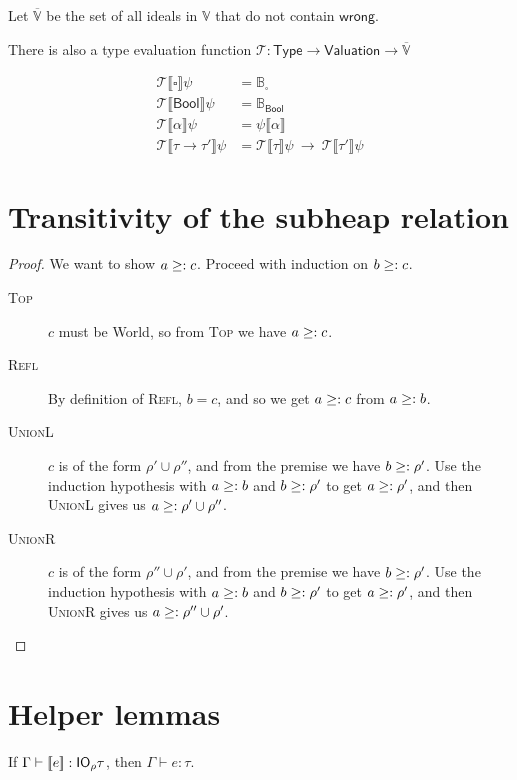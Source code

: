 Let $\overline{\mathbb{V}}$ be the set of all ideals in $\mathbb{V}$
that do not contain $\mathsf{wrong}$.

There is also a type evaluation function $\mathcal{T} : \mathsf{Type}
\rightarrow \mathsf{Valuation} \rightarrow \overline{\mathbb{V}}$

\begin{align*}
  \mathcal{T}\llbracket \square \rrbracket\psi &= \mathbb{B}_{ \square } \\
  \mathcal{T}\llbracket \mathsf{Bool} \rrbracket \psi &= \mathbb{B}_{\mathsf{Bool}} \\
  \mathcal{T}\llbracket \alpha \rrbracket \psi &= \psi \llbracket \alpha \rrbracket \\
  \mathcal{T} \llbracket \tau \rightarrow \tau' \rrbracket \psi &= \mathcal{T}\llbracket \tau \rrbracket \psi \ \rightarrow \
                             \mathcal{T} \llbracket \tau' \rrbracket \psi
\end{align*}


\section{Transitivity of the subheap relation}\label{proof:subheaptransitive}
\begin{proof}
  We want to show $a \geq: c$. Proceed with induction on $b \geq: c$.
  \begin{description}
  \item[\rm\textsc{Top}]
    $c$ must be \textsf{World}, so from \textsc{Top} we have $a
    \geq: c$.
  \item[\rm\textsc{Refl}] By definition of \textsc{Refl}, $b =
    c$, and so we get $a \geq: c$ from $a \geq: b$.
  \item[\rm\textsc{UnionL}] $c$ is of the form $\rho' \cup \rho''$, and
    from the premise we have $b \geq: \rho'$. Use the induction
    hypothesis with $a \geq: b$ and $b \geq: \rho'$ to get $a \geq:
    \rho'$, and then \textsc{UnionL} gives us $a \geq: \rho' \cup \rho''$.
  \item[\rm\textsc{UnionR}]  $c$ is of the form $\rho'' \cup \rho'$, and
    from the premise we have $b \geq: \rho'$. Use the induction
    hypothesis with $a \geq: b$ and $b \geq: \rho'$ to get $a \geq:
    \rho'$, and then \textsc{UnionR} gives us $a \geq: \rho'' \cup \rho'$.
  \end{description}
\end{proof}

\section{Helper lemmas}
\begin{lemma}\label{lem:unwrapLift}
  If $\Gamma \vdash [\![ e]\!] : \mathsf{IO}_\rho \tau$, then $\Gamma \vdash e : \tau$.
\end{lemma}


